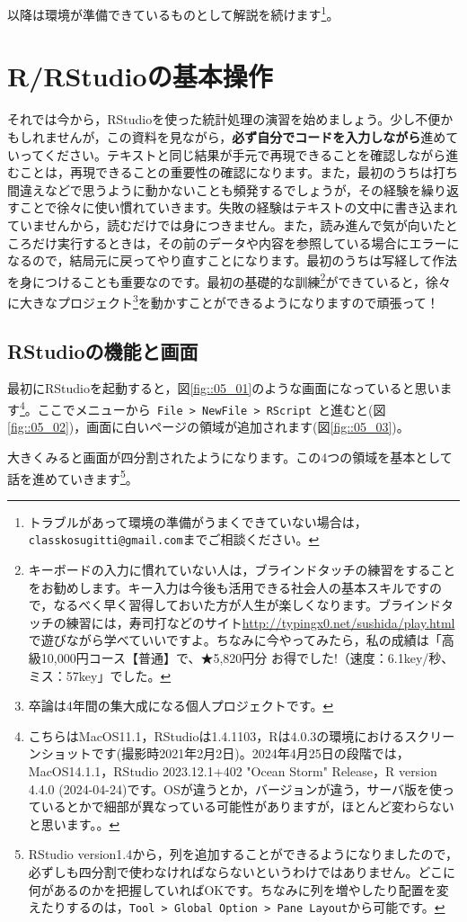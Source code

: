\documentclass{ltjsbook}
\begin{document}
以降は環境が準備できているものとして解説を続けます\footnote{トラブルがあって環境の準備がうまくできていない場合は，\texttt{classkosugitti@gmail.com}までご相談ください。}。

\section{R/RStudioの基本操作}
それでは今から，RStudioを使った統計処理の演習を始めましょう。少し不便かもしれませんが，この資料を見ながら，\textbf{必ず自分でコードを入力しながら}進めていってください。テキストと同じ結果が手元で再現できることを確認しながら進むことは，再現できることの重要性の確認になります。また，最初のうちは打ち間違えなどで思うように動かないことも頻発するでしょうが，その経験を繰り返すことで徐々に使い慣れていきます。失敗の経験はテキストの文中に書き込まれていませんから，読むだけでは身につきません。また，読み進んで気が向いたところだけ実行するときは，その前のデータや内容を参照している場合にエラーになるので，結局元に戻ってやり直すことになります。最初のうちは写経して作法を身につけることも重要なのです。最初の基礎的な訓練\footnote{キーボードの入力に慣れていない人は，ブラインドタッチの練習をすることをお勧めします。キー入力は今後も活用できる社会人の基本スキルですので，なるべく早く習得しておいた方が人生が楽しくなります。ブラインドタッチの練習には，寿司打などのサイト\url{http://typingx0.net/sushida/play.html}で遊びながら学べていいですよ。ちなみに今やってみたら，私の成績は「高級10,000円コース【普通】で、★5,820円分 お得でした!（速度：6.1key/秒、ミス：57key」でした。}ができていると，徐々に大きなプロジェクト\footnote{卒論は4年間の集大成になる個人プロジェクトです。}を動かすことができるようになりますので頑張って！

\subsection{RStudioの機能と画面}
最初にRStudioを起動すると，図\ref{fig::05_01}のような画面になっていると思います\footnote{こちらはMacOS11.1，RStudioは1.4.1103，Rは4.0.3の環境におけるスクリーンショットです(撮影時2021年2月2日)。2024年4月25日の段階では，MacOS14.1.1，RStudio 2023.12.1+402 "Ocean Storm" Release，R version 4.4.0 (2024-04-24)です。OSが違うとか，バージョンが違う，サーバ版を使っているとかで細部が異なっている可能性がありますが，ほとんど変わらないと思います。。}。ここでメニューから\verb| File > NewFile > RScript |と進むと(図\ref{fig::05_02})，画面に白いページの領域が追加されます(図\ref{fig::05_03})。

大きくみると画面が四分割されたようになります。この4つの領域を基本として話を進めていきます\footnote{RStudio version1.4から，列を追加することができるようになりましたので，必ずしも四分割で使わなければならないというわけではありません。どこに何があるのかを把握していればOKです。ちなみに列を増やしたり配置を変えたりするのは，\verb|Tool > Global Option > Pane Layout|から可能です。}。
\end{document}
